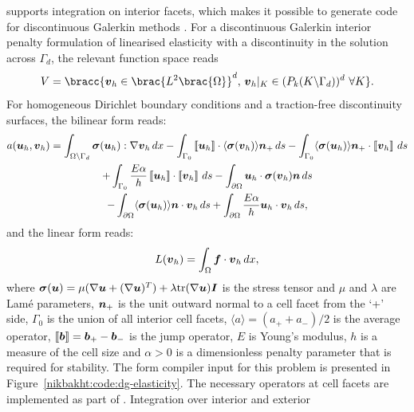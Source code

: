 \ffc{} supports integration on interior facets, which makes it possible
to generate code for discontinuous Galerkin methods \citep{OelgaardLoggEtAl2008}.
For a discontinuous Galerkin interior penalty formulation of linearised
elasticity with a discontinuity in the solution across $\Gamma_{d}$,
the relevant function space reads
%
\begin{equation}
 V = \bracc{\vect{v}_{h} \in \brac{L^{2}\brac{\Omega}}^{d}, \,
            \vect{v}_{h}|_K \in (P_{k}(K\backslash\Gamma_{d}))^{d} \ \forall K}.
\end{equation}
%
For homogeneous Dirichlet boundary conditions and a traction-free
discontinuity surfaces, the bilinear form reads:
%
\begin{multline}
 a(\boldsymbol{u}_{h}, \boldsymbol{v}_{h}) = \int_{\Omega \backslash \Gamma_{d}} \boldsymbol{\sigma}(\boldsymbol{u}_{h})
                                :  \nabla \boldsymbol{v}_{h} \, d x
 -  \int_{\Gamma_0} \left\llbracket {\boldsymbol{u}_{h}} \right\rrbracket \cdot \langle \boldsymbol{\sigma}(\boldsymbol{v}_{h}) \rangle \boldsymbol{n}_{+} \, d s
 - \int_{\Gamma_{0}} \langle \boldsymbol{\sigma}(\boldsymbol{u}_{h}) \rangle \boldsymbol{n}_{+} \cdot \left\llbracket {\boldsymbol{v}_{h}} \right\rrbracket  \, d s
\\
 + \int_{\Gamma_0} \frac{E \alpha}{h}  \left\llbracket {\boldsymbol{u}_{h}} \right\rrbracket \cdot \left\llbracket {\boldsymbol{v}_{h}} \right\rrbracket \, d s
 -  \int_{\partial \Omega} \boldsymbol{u}_{h} \cdot \boldsymbol{\sigma}(\boldsymbol{v}_{h})\boldsymbol{n} \, d s
\\
 - \int_{\partial \Omega} \langle \boldsymbol{\sigma}(\boldsymbol{u}_{h}) \rangle \boldsymbol{n} \cdot \boldsymbol{v}_{h}  \, d s
 + \int_{\partial \Omega} \frac{E \alpha}{h}  \boldsymbol{u}_{h} \cdot \boldsymbol{v}_{h} \, d s,
\end{multline}
%
and the linear form reads:
%
\begin{equation}
 L(\boldsymbol{v}_{h}) = \int_{\Omega} \boldsymbol{f} \cdot \boldsymbol{v}_{h} \, d x,
\end{equation}
%
where
$\boldsymbol{\sigma}(\boldsymbol{u})
= \mu(\nabla\boldsymbol{u} + (\nabla \boldsymbol{u})^{T} )
+ \lambda {\rm tr}(\nabla \boldsymbol{u}) \boldsymbol{I}$
is the stress tensor and $\mu$ and $\lambda$ are Lam\'e parameters,
$\boldsymbol{n}_{+}$ is the unit outward normal to a cell facet from the `+' side,
$\Gamma_0$ is the union of all interior cell facets,
$\langle a \rangle = (a_{+} + a_{-})/2$ is the  average operator,
$\left\llbracket {\boldsymbol{b}} \right\rrbracket = \boldsymbol{b}_{+} - \boldsymbol{b}_{-}$ is the jump operator,
$E$ is Young's modulus, $h$ is a measure of the cell size
and $\alpha > 0$ is a dimensionless penalty parameter that
is required for stability.
The form compiler input for this problem is presented in
Figure~\ref{nikbakht:code:dg-elasticity}. The necessary operators at cell facets
are implemented as part of \ufl{}. Integration over interior and exterior
